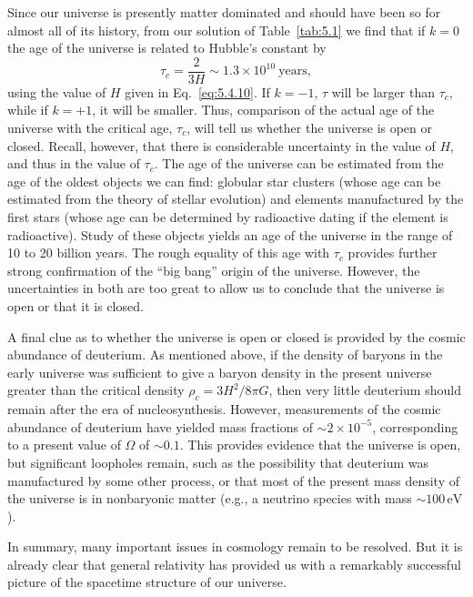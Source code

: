 Since our universe is presently matter dominated and should have been so for almost
all of its history, from our solution of Table~\ref{tab:5.1} we find that if \(k=0\) the
age of the universe is related to Hubble's constant by
\begin{equation}
  \tau_c=\frac{2}{3H}\sim1.3\times10^{10}\ \text{years},
  \tag{5.4.11}\label{eq:5.4.11}
\end{equation}
using the value of \(H\) given in Eq.~\eqref{eq:5.4.10}. If \(k=-1\), \(\tau\) will be
larger than \(\tau_c\), while if \(k=+1\), it will be smaller. Thus, comparison of the
actual age of the universe with the critical age, \(\tau_c\), will tell us whether the
universe is open or closed. Recall, however, that there is considerable uncertainty in
the value of \(H\), and thus in the value of \(\tau_c\). The age of the universe can be
estimated from the age of the oldest objects we can find: globular star clusters (whose
age can be estimated from the theory of stellar evolution) and elements manufactured
by the first stars (whose age can be determined by radioactive dating if the element is
radioactive). Study of these objects yields an age of the universe in the range of 10 to
20 billion years. The rough equality of this age with \(\tau_c\) provides further strong
confirmation of the ``big bang'' origin of the universe. However, the uncertainties in
both are too great to allow us to conclude that the universe is open or that it is closed.

A final clue as to whether the universe is open or closed is provided by the cosmic
abundance of deuterium. As mentioned above, if the density of baryons in the early
universe was sufficient to give a baryon density in the present universe greater than
the critical density \(\rho_c=3H^2/8\pi G\), then very little deuterium should remain
after the era of nucleosynthesis. However, measurements of the cosmic abundance of
deuterium have yielded mass fractions of \(\sim2\times10^{-5}\), corresponding to a
present value of \(\Omega\) of \(\sim0.1\). This provides evidence that the universe is
open, but significant loopholes remain, such as the possibility that deuterium was
manufactured by some other process, or that most of the present mass density of the
universe is in nonbaryonic matter (e.g., a neutrino species with mass \(\sim100\,
\mathrm{eV}\)).

In summary, many important issues in cosmology remain to be resolved. But it is
already clear that general relativity has provided us with a remarkably successful
picture of the spacetime structure of our universe.
